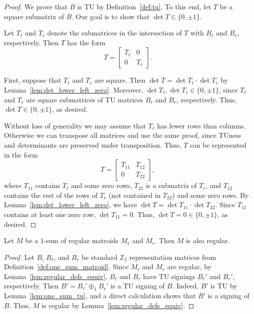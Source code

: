 \begin{proof}
    We prove that $B$ is TU by Definition~\ref{def:tu}. To this end, let $T$ be a square submatrix of $B$. Our goal is to show that $\det T \in \{0, \pm 1\}$.

    Let $T_{\ell}$ and $T_{r}$ denote the submatrices in the intersection of $T$ with $B_{\ell}$ and $B_{r}$, respectively. Then $T$ has the form
    \[
        T = \begin{bmatrix} T_{\ell} & 0 \\ 0 & T_{r} \end{bmatrix}.
    \]

    First, suppose that $T_{\ell}$ and $T_{r}$ are square. Then $\det T = \det T_{\ell} \cdot \det T_{r}$ by Lemma~\ref{lem:det_lower_left_zero}. Moreover, $\det T_{\ell}, \det T_{r} \in \{0, \pm 1\}$, since $T_{\ell}$ and $T_{r}$ are square submatrices of TU matrices $B_{\ell}$ and $B_{r}$, respectively. Thus, $\det T \in \{0, \pm 1\}$, as desired.

    Without loss of generality we may assume that $T_{\ell}$ has fewer rows than columns. Otherwise we can transpose all matrices and use the same proof, since TUness and determinants are preserved under transposition. Thus, $T$ can be represented in the form
    \[
        T = \begin{bmatrix} T_{11} & T_{12} \\ 0 & T_{22} \end{bmatrix},
    \]
    where $T_{11}$ contains $T_{\ell}$ and some zero rows, $T_{22}$ is a submatrix of $T_{r}$, and $T_{12}$ contains the rest of the rows of $T_{r}$ (not contained in $T_{22}$) and some zero rows. By Lemma~\ref{lem:det_lower_left_zero}, we have $\det T = \det T_{11} \cdot \det T_{22}$. Since $T_{11}$ contains at least one zero row, $\det T_{11} = 0$. Thus, $\det T = 0 \in \{0, \pm 1\}$, as desired.
\end{proof}

\begin{lemma}\label{lem:one_sum_regular}
    Let $M$ be a $1$-sum of regular matroids $M_{\ell}$ and $M_{r}$. Then $M$ is also regular.
\end{lemma}

\begin{proof}
    Let $B$, $B_{\ell}$, and $B_{r}$ be standard $\mathbb{Z}_{2}$ representation matrices from Definition~\ref{def:one_sum_matroid}. Since $M_{\ell}$ and $M_{r}$ are regular, by Lemma~\ref{lem:regular_defs_equiv}, $B_{\ell}$ and $B_{r}$ have TU signings $B_{\ell}'$ and $B_{r}'$, respectively. Then $B' = B_{\ell}' \oplus_{1} B_{r}'$ is a TU signing of $B$. Indeed, $B'$ is TU by Lemma~\ref{lem:one_sum_tu}, and a direct calculation shows that $B'$ is a signing of $B$. Thus, $M$ is regular by Lemma~\ref{lem:regular_defs_equiv}.
\end{proof}
